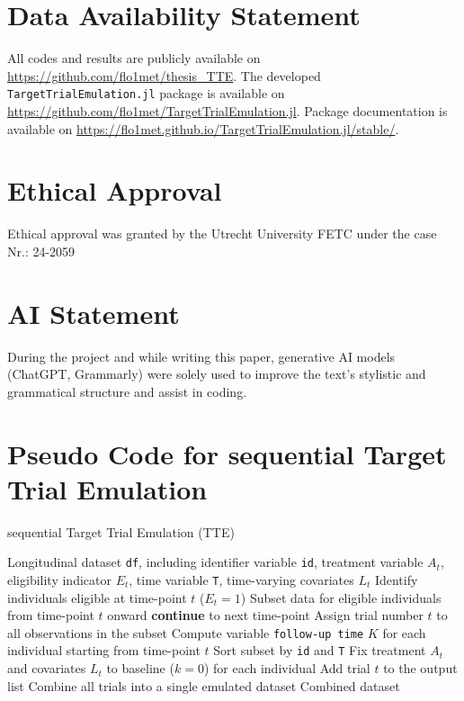 \documentclass[pdflatex,sn-vancouver-ay]{sn-jnl}%
\theoremstyle{thmstyleone}%
\theoremstyle{thmstyletwo}%
\theoremstyle{thmstylethree}%
\newcommand{\juliaTTE}{\texttt{TargetTrialEmulation.jl}}
\begin{document}
\begin{appendices}

\section*{Data Availability Statement}
All codes and results are publicly available on \url{https://github.com/flo1met/thesis_TTE}. The developed \juliaTTE{} package is available on \url{https://github.com/flo1met/TargetTrialEmulation.jl}. Package documentation is available on \url{https://flo1met.github.io/TargetTrialEmulation.jl/stable/}.

\section*{Ethical Approval}
Ethical approval was granted by the Utrecht University FETC under the case Nr.: 24-2059

\section*{AI Statement}
During the project and while writing this paper, generative AI models (ChatGPT, Grammarly) were solely used to improve the text's stylistic and grammatical structure and assist in coding.

\pagebreak

\section{Pseudo Code for sequential Target Trial Emulation}\label{sec:apxseqtte}
\begin{algorithm}
\caption{sequential Target Trial Emulation (TTE)}\label{alg:seqtte}
\begin{algorithmic}[1]
\Require Longitudinal dataset \texttt{df}, including identifier variable \texttt{id}, treatment variable $A_t$, eligibility indicator $E_t$, time variable \texttt{T}, time-varying covariates \textbf{$L_t$}
    \State Identify individuals eligible at time-point $t$ ($E_t = 1$)
    \State Subset data for eligible individuals from time-point $t$ onward
        \State \textbf{continue} to next time-point
    \EndIf
    \State Assign trial number $t$ to all observations in the subset
    \State Compute variable \texttt{follow-up time} $K$ for each individual starting from time-point $t$
    \State Sort subset by \texttt{id} and \texttt{T}
    \State Fix treatment $A_t$ and covariates $L_t$ to baseline ($k = 0$) for each individual
    \State Add trial $t$ to the output list
\EndFor
\State Combine all trials into a single emulated dataset
\State \Return Combined dataset
\end{algorithmic}
\end{algorithm}


\end{appendices}
\end{document}
